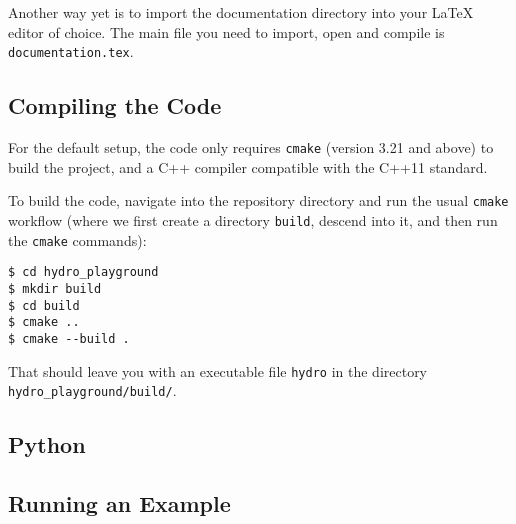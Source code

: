 Another way yet is to import the documentation directory into your LaTeX editor
of choice. The main file you need to import, open and compile is
\verb|documentation.tex|.









\subsection{Compiling the Code}

For the default setup, the code only requires \verb|cmake| (version 3.21 and
above) to build the project, and a C++ compiler compatible with the C++11
standard.

To build the code, navigate into the repository directory and run the usual
\verb|cmake| workflow (where we first create a directory \verb|build|, descend
into it, and then run the \verb|cmake| commands):

\begin{lstlisting}
$ cd hydro_playground
$ mkdir build
$ cd build
$ cmake ..
$ cmake --build .
\end{lstlisting}

That should leave you with an executable file \verb|hydro| in the directory
\verb|hydro_playground/build/|.



\subsection{Python}





\subsection{Running an Example}




